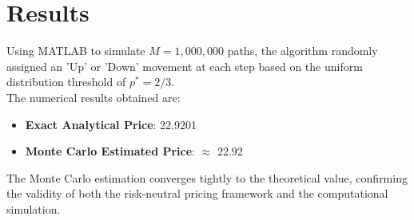 \documentclass[12pt, a4paper]{article}
\begin{document}
\section{Results}
Using MATLAB to simulate $M = 1,000,000$ paths, the algorithm randomly assigned an 'Up' or 'Down' movement at each step based on the uniform distribution threshold of $p^* = 2/3$.\\
The numerical results obtained are:
\begin{itemize}
    \item \textbf{Exact Analytical Price}: 22.9201
    \item \textbf{Monte Carlo Estimated Price}: $\approx$ 22.92
\end{itemize}
The Monte Carlo estimation converges tightly to the theoretical value, confirming the validity of both the risk-neutral pricing framework and the computational simulation.

\newpage
\end{document}

